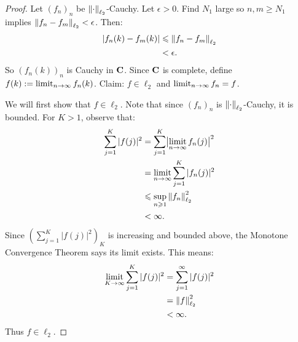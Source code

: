 \documentclass[11pt,twoside,openany]{memoir}
\begin{document}
        \begin{proof}
            Let $(f_n)_n$ be $\left\lVert \cdot \right\rVert_{\ell_2}$-Cauchy. Let $\epsilon > 0$. Find $N_1$ large so $n,m \geq N_1$ implies $\left\lVert f_n - f_m \right\rVert_{\ell_2} < \epsilon$. Then:
                \begin{equation*}
                \begin{split}
                    |f_n(k) - f_m(k)|
                    & \leqslant \left\lVert f_n - f_m \right\rVert_{\ell_2} \\
                    & < \epsilon.
                \end{split}
                \end{equation*}
            So $(f_n(k))_n$ is Cauchy in $\mathbf{C}$. Since $\mathbf{C}$ is complete, define $f(k):= \operatorname*{limit}_{n \rightarrow \infty} f_n(k)$. Claim: $f \in \ell_2$ and $\operatorname*{limit}_{n \rightarrow \infty}f_n = f$. 
            
            We will first show that $f \in \ell_2$. Note that since $(f_n)_n$ is $\left\lVert \cdot \right\rVert_{\ell_2}$-Cauchy, it is bounded. For $K > 1$, observe that:
                \begin{equation*}
                \begin{split}
                    \sum_{j = 1}^K |f(j)|^2 
                    & = \sum_{j = 1}^K \bigl|\operatorname*{limit}_{n \rightarrow \infty}f_n(j)\bigr|^2 \\
                    & = \operatorname*{limit}_{n \rightarrow \infty} \sum_{j = 1}^K |f_n(j)|^2 \\
                    & \leqslant \sup_{n \geqslant 1} \left\lVert f_n \right\rVert_{\ell_2}^2 \\
                    & < \infty.
                \end{split}
                \end{equation*}
            Since $\left( \sum_{j = 1}^K |f(j)|^2 \right)_K$ is increasing and bounded above, the Monotone Convergence Theorem says its limit exists. This means:
                \begin{equation*}
                \begin{split}
                    \operatorname*{limit}_{K \rightarrow \infty}\sum_{j = 1}^K |f(j)|^2 
                    & = \sum_{j = 1}^\infty |f(j)|^2 \\
                    & = \left\lVert f \right\rVert^2_{\ell_2} \\
                    & < \infty.
                \end{split}
                \end{equation*}
            Thus $f \in \ell_2$.


\end{proof}
\end{document}
